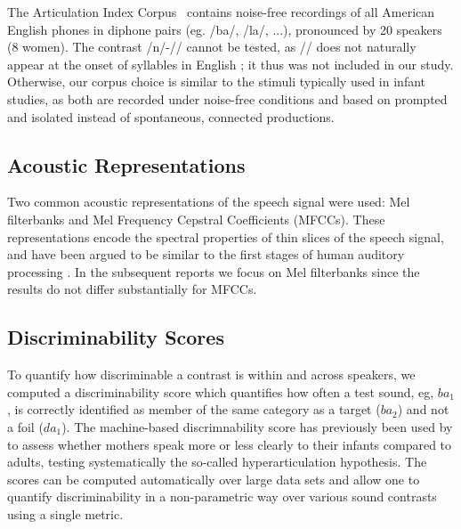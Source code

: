 \documentclass[10pt,letterpaper]{article}
\begin{document}
The Articulation Index Corpus~\cite{AICreference} contains noise-free recordings of all American English phones in diphone pairs (eg. /ba/, /la/, ...), pronounced by 20 speakers (8 women). The contrast /n/-/\textipa{\ng}/ cannot be tested, as /\textipa{\ng}/ does not naturally appear at the onset of syllables in English \cite{Clough2015}; it thus was not included in our study. Otherwise, our corpus choice is similar to the stimuli typically used in infant studies, as both are recorded under noise-free conditions and based on prompted and isolated instead of spontaneous, connected productions.   

\subsection{Acoustic Representations} 
Two common acoustic representations of the speech signal were used: Mel filterbanks and Mel Frequency Cepstral Coefficients (MFCCs). These representations encode the spectral properties of thin slices of the speech signal, and have been argued to be similar to the first stages of human auditory processing \cite{REFERENCE}. In the subsequent reports we focus on Mel filterbanks since the results do not differ substantially for MFCCs. 


\subsection{Discriminability Scores}


To quantify how discriminable a contrast is within and across speakers, we computed a discriminability score \cite{Schatz2013, Schatz2014} which quantifies how often a test sound, eg, $ba_1$, is correctly identified as member of the same category as a target ($ba_2$) and not a foil ($da_1$). 
The machine-based discrimnability score has previously been used by  to assess whether mothers speak more or less clearly to their infants compared to adults, testing systematically the so-called hyperarticulation hypothesis. The scores can be computed automatically over large data sets and allow one to quantify discriminability in a non-parametric way over various sound contrasts using a single metric.
\end{document}
